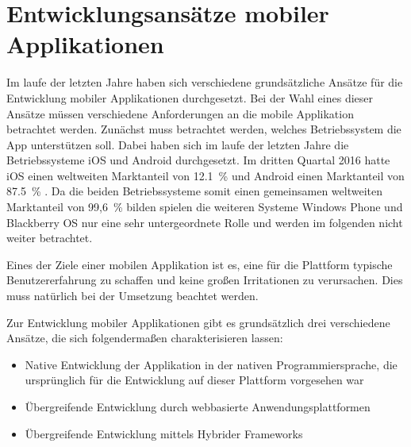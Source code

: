 \chapter{Entwicklungsansätze mobiler Applikationen}
\label{chap:entwicklungsansaetze}
%
Im laufe der letzten Jahre haben sich verschiedene grundsätzliche Ansätze für die Entwicklung mobiler Applikationen durchgesetzt. Bei der Wahl eines dieser Ansätze müssen verschiedene Anforderungen an die mobile Applikation betrachtet werden. Zunächst muss betrachtet werden, welches Betriebssystem die App unterstützen soll. Dabei haben sich im laufe der letzten Jahre die Betriebssysteme iOS und Android durchgesetzt. Im dritten Quartal 2016 hatte iOS einen weltweiten Marktanteil von 12.1~\% und Android einen Marktanteil von 87.5~\% \cite{strategyAnalyticsMarktanteile}. Da die beiden Betriebssysteme somit einen gemeinsamen weltweiten Marktanteil von 99,6~\%  bilden spielen die weiteren Systeme Windows Phone und Blackberry OS nur eine sehr untergeordnete Rolle und werden im folgenden nicht weiter betrachtet.

Eines der Ziele einer mobilen Applikation ist es, eine für die Plattform typische Benutzererfahrung zu schaffen und keine großen Irritationen zu verursachen. Dies muss natürlich bei der Umsetzung beachtet werden.

Zur Entwicklung mobiler Applikationen gibt es grundsätzlich drei verschiedene Ansätze, die sich folgendermaßen charakterisieren lassen:
\begin{itemize}
    \item Native Entwicklung der Applikation in der nativen Programmiersprache, die ursprünglich für die Entwicklung auf dieser Plattform vorgesehen war
    \item Übergreifende Entwicklung durch webbasierte Anwendungsplattformen
    \item Übergreifende Entwicklung mittels Hybrider Frameworks
\end{itemize}
%
%
